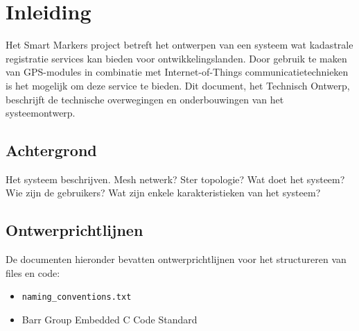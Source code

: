 \section{Inleiding}
Het Smart Markers project betreft het ontwerpen van een systeem wat kadastrale registratie services kan bieden voor ontwikkelingslanden. Door gebruik te maken van GPS-modules in combinatie met Internet-of-Things communicatietechnieken is het mogelijk om deze service te bieden. Dit document, het Technisch Ontwerp, beschrijft de technische overwegingen en onderbouwingen van het systeemontwerp.

\subsection{Achtergrond}
Het systeem beschrijven. Mesh netwerk? Ster topologie?
Wat doet het systeem?
Wie zijn de gebruikers?
Wat zijn enkele karakteristieken van het systeem?

\subsection{Ontwerprichtlijnen}
De documenten hieronder bevatten ontwerprichtlijnen voor het structureren van files en code:
\begin{itemize}
    \item \texttt{naming\_conventions.txt}
    \item Barr Group Embedded C Code Standard \citep{BARR_STD}
\end{itemize}
